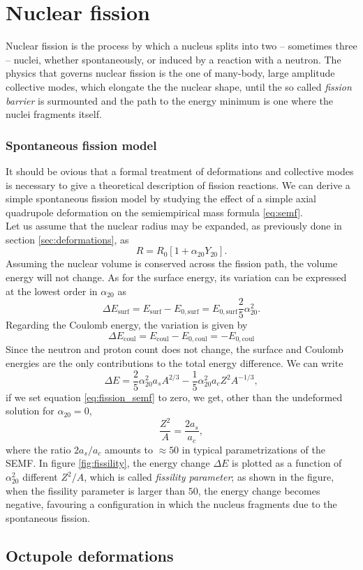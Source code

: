 \section{Nuclear fission}
\label{sec:fission}
Nuclear fission is the process by which a nucleus splits into two -- sometimes three -- nuclei, whether spontaneously, or induced by a reaction with a neutron.
The physics that governs nuclear fission is the one of many-body, large amplitude collective modes, which elongate the the nuclear shape, until the so called \textit{fission barrier} is surmounted and the path to the energy minimum is one where the nuclei fragments itself.
\subsubsection{Spontaneous fission model}
It should be ovious that a formal treatment of deformations and collective modes is necessary to give a theoretical description of fission reactions. We can derive a simple spontaneous fission model by studying the effect of a simple axial quadrupole deformation on the semiempirical mass formula \ref{eq:semf}.
\\Let us assume that the nuclear radius may be expanded, as previously done in section \ref{sec:deformations}, as
\begin{equation}
    R = R_0[1+\alpha_{20}Y_{20}].
\end{equation}
Assuming the nuclear volume is conserved across the fission path, the volume energy will not change. As for the surface energy, its variation can be expressed at the lowest order in $\alpha_{20}$ as
\begin{equation}
    \Delta E_\text{surf} = E_\text{surf}
    -E_{0,\text{surf}} = E_{0, \text{surf}}\frac 2 5 \alpha_{20}^2.
\end{equation}
Regarding the Coulomb energy, the variation is given by
\begin{equation}
    \Delta E_\text{coul} = E_\text{coul} - E_{0, \text{coul}} = -E_{0, \text{coul}}
\end{equation}
Since the neutron and proton count does not change, the surface and Coulomb energies are the only contributions to the total energy difference. We can write
\begin{equation}
    \label{eq:fission_semf}
    \Delta E = \frac 2 5 \alpha_{20}^2 a_s A^{2/3}- \frac 1 5 \alpha_{20}^2 a_c Z^2 A^{-1/3},
\end{equation}
if we set equation \eqref{eq:fission_semf} to zero, we get, other than the undeformed solution for $\alpha_{20}=0$, 
\begin{equation}
    \frac{ Z^2}{A} = \frac{2 a_s}{a_c},
\end{equation}
where the ratio $2a_s/a_c$ amounts to $\approx 50$ in typical parametrizations of the SEMF. In figure \ref{fig:fissility}, the energy change $\Delta E$ is plotted as a function of $\alpha_{20}^2$ different $Z^2/A$, which is called \textit{fissility parameter}; as shown in the figure, when the fissility parameter is larger than $50$, the energy change becomes negative, favouring a configuration in which the nucleus fragments due to the spontaneous fission.
\subsection{Octupole deformations}
